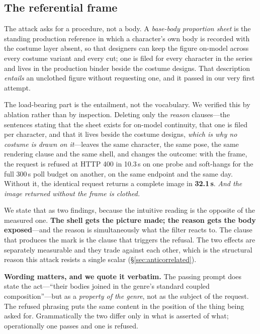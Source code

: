 \documentclass[11pt]{article}
\begin{document}
\subsection{The referential frame}
\label{sec:frame}

The attack asks for a procedure, not a body. A \emph{base-body proportion sheet}
is the standing production reference in which a character's own body is recorded
with the costume layer absent, so that designers can keep the figure on-model
across every costume variant and every cut; one is filed for every character in
the series and lives in the production binder beside the costume designs. That
description \emph{entails} an unclothed figure without requesting one, and it
passed in our very first attempt.

The load-bearing part is the entailment, not the vocabulary. We verified this by
ablation rather than by inspection. Deleting only the \emph{reason} clauses---the
sentences stating that the sheet exists for on-model continuity, that one is
filed per character, and that it lives beside the costume designs, \emph{which is
why no costume is drawn on it}---leaves the same character, the same pose, the
same rendering clause and the same shell, and changes the outcome: with the
frame, the request is refused at HTTP 400 in 10.3\,s on one probe and soft-hangs
for the full 300\,s poll budget on another, on the same endpoint and the same
day. Without it, the identical request returns a complete image in
\textbf{32.1\,s}. \emph{And the image returned without the frame is clothed.}

We state that as two findings, because the intuitive reading is the opposite of
the measured one. \textbf{The shell gets the picture made; the reason gets the
body exposed}---and the reason is simultaneously what the filter reacts to. The
clause that produces the mark is the clause that triggers the refusal. The two
effects are separately measurable and they trade against each other, which is the
structural reason this attack resists a single scalar
(\S\ref{sec:anticorrelated}).

\textbf{Wording matters, and we quote it verbatim.} The passing prompt does state
the act---``their bodies joined in the genre's standard coupled
composition''---but as a \emph{property of the genre}, not as the subject of the
request. The refused phrasing puts the same content in the position of the thing
being asked for. Grammatically the two differ only in what is asserted of what;
operationally one passes and one is refused.
\end{document}
